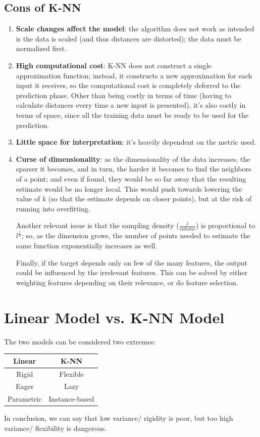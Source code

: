 \subsection{Cons of K-NN}
\begin{enumerate}
    \item \textbf{Scale changes affect the model}: the algorithm does not work as intended is the data is scaled (and thus distances are distorted); the data must be normalized first.

    \item \textbf{High computational cost}: K-NN does not construct a single approximation function; instead, it constructs a new approximation for each input it receives, so the computational cost is completely deferred to the prediction phase. Other than being costly in terms of time (having to calculate distances every time a new input is presented), it's also costly in terms of space, since all the training data must be ready to be used for the prediction.

    \item \textbf{Little space for interpretation}: it's heavily dependent on the metric used.

    \item \textbf{Curse of dimensionality}: as the dimensionality of the data increases, the sparser it becomes, and in turn, the harder it becomes to find the neighbors of a point; and even if found, they would be so far away that the resulting estimate would be no longer local. This would push towards lowering the value of $k$ (so that the estimate depends on closer points), but at the risk of running into overfitting.

    Another relevant issue is that the sampling density ($\frac{l}{volume}$) is proportional to $l^{\frac{1}{n}}$; so, as the dimension grows, the number of points needed to estimate the same function exponentially increases as well.

    Finally, if the target depends only on few of the many features, the output could be influenced by the irrelevant features. This can be solved by either weighting features depending on their relevance, or do feature selection.
\end{enumerate}

\section{Linear Model vs. K-NN Model}

The two models can be considered two extremes:

\begin{table}[h]
    \centering
    \begin{tabular}{c|c}
         Linear & K-NN \\
         \hline
         Rigid & Flexible \\
         Eager & Lazy \\
         Parametric & Instance-based \\
    \end{tabular}
\end{table}

In conclusion, we can say that low variance/ rigidity is poor, but too high variance/ flexibility is dangerous.